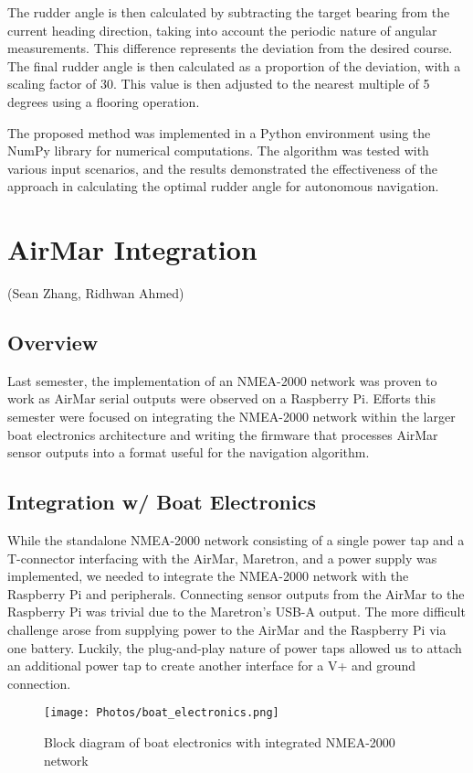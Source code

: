 \documentclass{article}
\begin{document}
The rudder angle is then calculated by subtracting the target bearing from the current heading direction, taking into account the periodic nature of angular measurements. This difference represents the deviation from the desired course. The final rudder angle is then calculated as a proportion of the deviation, with a scaling factor of 30. This value is then adjusted to the nearest multiple of 5 degrees using a flooring operation.

The proposed method was implemented in a Python environment using the NumPy library for numerical computations. The algorithm was tested with various input scenarios, and the results demonstrated the effectiveness of the approach in calculating the optimal rudder angle for autonomous navigation.

\section{AirMar Integration}
(Sean Zhang, Ridhwan Ahmed)
\subsection{Overview}
Last semester, the implementation of an NMEA-2000 network was proven to work as AirMar serial outputs were observed on a Raspberry Pi. Efforts this semester were focused on integrating the NMEA-2000 network within the larger boat electronics architecture and writing the firmware that processes AirMar sensor outputs into a format useful for the navigation algorithm.
\subsection{Integration w/ Boat Electronics}
While the standalone NMEA-2000 network consisting of a single power tap and a T-connector interfacing with the AirMar, Maretron, and a power supply was implemented, we needed to integrate the NMEA-2000 network with the Raspberry Pi and peripherals. Connecting sensor outputs from the AirMar to the Raspberry Pi was trivial due to the Maretron's USB-A output. The more difficult challenge arose from supplying power to the AirMar and the Raspberry Pi via one battery. Luckily, the plug-and-play nature of power taps allowed us to attach an additional power tap to create another interface for a V+ and ground connection.  

\begin{figure}[h]
    \centering
    \texttt{[image: Photos/boat\_electronics.png]}
    \caption{Block diagram of boat electronics with integrated NMEA-2000 network}
    \label{fig: Photos/electrical_blockRS422.png}
\end{figure}
\end{document}

